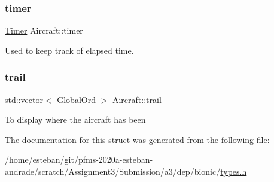 \subsubsection{\texorpdfstring{timer}{timer}}
{\footnotesize\ttfamily \hyperlink{classTimer}{Timer} Aircraft\+::timer}

Used to keep track of elapsed time. \mbox{\label{structAircraft_a5bb8eeef2d86c60fb64bb4d6b55ac594}} 
\subsubsection{\texorpdfstring{trail}{trail}}
{\footnotesize\ttfamily std\+::vector$<$ \hyperlink{structGlobalOrd}{Global\+Ord} $>$ Aircraft\+::trail}

To display where the aircraft has been 

The documentation for this struct was generated from the following file\+:\begin{DoxyCompactItemize}
\item 
/home/esteban/git/pfms-\/2020a-\/esteban-\/andrade/scratch/\+Assignment3/\+Submission/a3/dep/bionic/\hyperlink{bionic_2types_8h}{types.\+h}\end{DoxyCompactItemize}
